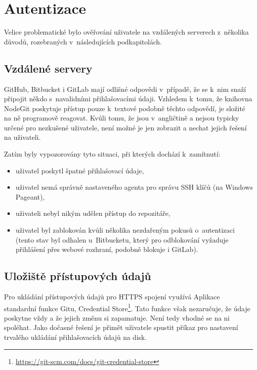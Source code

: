 \section{Autentizace}

Velice problematické bylo ověřování uživatele na vzdálených serverech z~několika důvodů, rozebraných v~následujících podkapitolách.

\subsection{Vzdálené servery}

GitHub, Bitbucket i GitLab mají odlišné odpovědi v~případě, že se k~nim snaží připojit někdo s~navalidními přihlašovacími údaji. Vzhledem k~tomu, že knihovna NodeGit poskytuje přístup pouze k~textové podobně těchto odpovědí, je složité na ně programově reagovat. Kvůli tomu, že jsou v~angličtině a nejsou typicky určené pro nezkušené uživatele, není možné je jen zobrazit a nechat jejich řešení na uživateli.

Zatím byly vypozorovány tyto situaci, při kterých dochází k~zamítnutí:

\begin{itemize}
	\item uživatel poskytl špatné přihlašovací údaje,
	\item uživatel nemá správně nastaveného agenta pro správu SSH klíčů (na Windows Pageant),
	\item uživateli nebyl nikým udělen přístup do repozitáře,
	\item uživatel byl zablokován kvůli několika nezdařeným pokusů o~autentizaci (tento stav byl odhalen u~Bitbucketu, který pro odblokování vyžaduje přihlášení přes webové rozhraní, podobně blokuje i GitLab).
\end{itemize}

\subsection{Uložiště přístupových údajů}

Pro ukládání přístupových údajů pro HTTPS spojení využívá Aplikace standardní funkce Gitu, Credential Store\footnote{\url{https://git-scm.com/docs/git-credential-store}}. Tato funkce však nezaručuje, že údaje poskytne vždy a že jejich změnu si zapamatuje. Není tedy vhodné se na ni spoléhat. Jako dočasné řešení je přimět uživatele spustit příkaz pro nastavení trvalého ukládání přihlašovacích údajů na disk.

